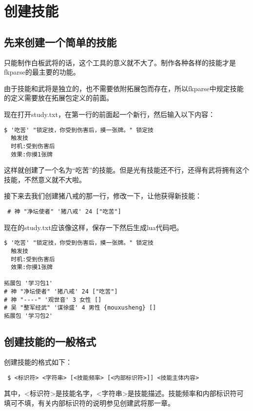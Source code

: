 \chapter{创建技能}

\section{先来创建一个简单的技能}

只能制作白板武将的话，这个工具的意义就不大了。制作各种各样的技能才是fkparse的最主要的功能。

由于技能和武将是独立的，也不需要依附拓展包而存在，所以fkparse中规定技能的定义需要放在拓展包定义的前面。

现在打开study.txt，在第一行的前面起一个新行，然后输入以下内容：

\begin{verbatim}
$ '吃苦' "锁定技，你受到伤害后，摸一张牌。" 锁定技
  触发技
  时机:受到伤害后
  效果:你摸1张牌
\end{verbatim}

这样就创建了一个名为“吃苦”的技能。但是光有技能还不行，还得有武将拥有这个技能，不然意义就不大啦。

接下来去我们创建猪八戒的那一行，修改一下，让他获得新技能：

\begin{verbatim}
 # 神 "净坛使者" '猪八戒' 24 ["吃苦"]
\end{verbatim}

现在的study.txt应该像这样，保存一下然后生成lua代码吧。

\begin{verbatim}
$ '吃苦' "锁定技，你受到伤害后，摸一张牌。" 锁定技
  触发技
  时机:受到伤害后
  效果:你摸1张牌

拓展包 '学习包1'
# 神 "净坛使者" '猪八戒' 24 ["吃苦"]
# 神 "----" '观世音' 3 女性 []
# 吴 "整军经武" '谋徐盛' 4 男性 {mouxusheng} []
拓展包 '学习包2'
\end{verbatim}

\section{创建技能的一般格式}

创建技能的格式如下：

\begin{verbatim}
 $ <标识符> <字符串> [<技能频率> [<内部标识符>]] <技能主体内容>
\end{verbatim}

其中，<标识符>是技能名字，<字符串>是技能描述。技能频率和内部标识符可填可不填，有关内部标识符的说明参见创建武将那一章。

